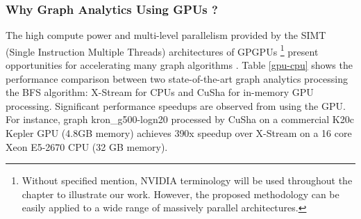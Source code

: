 \subsubsection{Why Graph Analytics Using GPUs ?}
The high compute power and multi-level parallelism provided by the SIMT (Single Instruction Multiple Threads) architectures of GPGPUs \footnote{\scriptsize Without specified mention, NVIDIA terminology will be used throughout the chapter
to illustrate our work. However, the proposed methodology can be easily applied to a wide range of massively
parallel architectures.} present opportunities for 
accelerating many graph algorithms \cite{medusa, cusha,vertexapi,mapgraph}. Table \ref{gpu-cpu} shows the performance comparison between two state-of-the-art graph analytics 
processing the BFS algorithm: X-Stream \cite{xstream} for CPUs and CuSha \cite{cusha} for in-memory GPU processing. Significant performance speedups are
observed from using the GPU. For instance,  graph kron\_g500-logn20 \cite{kron20} processed by CuSha on a commercial K20c Kepler GPU 
(4.8GB memory) achieves 390x speedup over X-Stream on a 16 core Xeon E5-2670 CPU (32 GB memory).

   





